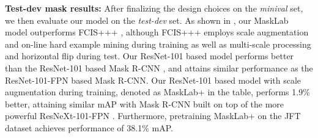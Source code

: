 \begin{table*}[!t]
  \centering
  \caption{Object detection single model \textit{box} mAP on COCO test-dev. \textbf{MaskLab+}: Employ scale augmentation during training.}
  \label{tab:test_dev_box}
\end{table*}


\textbf{Test-dev mask results:} After finalizing the design choices on the \textit{minival} set, we then evaluate our model on the \textit{test-dev} set. As shown in , our MaskLab model outperforms FCIS+++ \cite{dai2017fully}, although FCIS+++ employs scale augmentation and on-line hard example mining \cite{shrivastava2016training} during training as well as multi-scale processing and horizontal flip during test. Our ResNet-101 based model performs better than the ResNet-101 based Mask R-CNN \cite{he2017mask}, and attains similar performance as the ResNet-101-FPN based Mask R-CNN. Our ResNet-101 based model with scale augmentation during training, denoted as MaskLab+ in the table, performs 1.9\% better, attaining similar mAP with Mask R-CNN built on top of the more powerful ResNeXt-101-FPN \cite{lin2016feature, xie2017aggreated}. Furthermore, pretraining MaskLab+ on the JFT dataset achieves performance of 38.1\% mAP.

